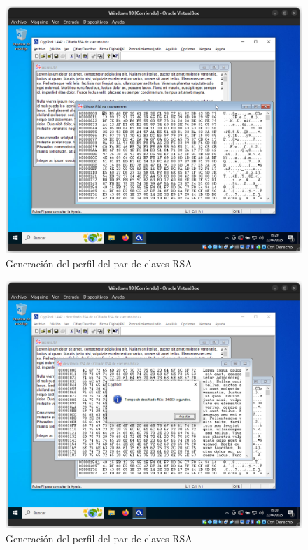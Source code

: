 \begin{figure}[H]
    \includegraphics[width=\textwidth]{EncriptadoRSA-3}
    \caption{Generación del perfil del par de claves RSA}
\end{figure}

\begin{figure}[H]
    \includegraphics[width=\textwidth]{DesencriptadoRSA-1}
    \caption{Generación del perfil del par de claves RSA}
\end{figure}

